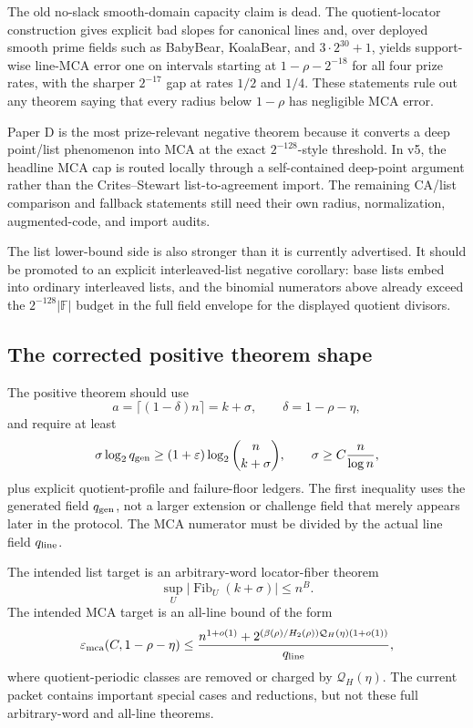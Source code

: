 \documentclass[11pt]{article}
\newcommand{\F}{\mathbb F}
\newcommand{\qline}{q_{\rm line}}
\newcommand{\qgen}{q_{\rm gen}}
\newcommand{\epsmca}{\varepsilon_{\rm mca}}
\newcommand{\Fib}{\operatorname{Fib}}
\newcommand{\Htwo}{H_2}
\newcommand{\QH}{\mathcal Q_H}
\begin{document}
The old no-slack smooth-domain capacity claim is dead.  The quotient-locator
construction gives explicit bad slopes for canonical lines and, over deployed
smooth prime fields such as BabyBear, KoalaBear, and \(3\cdot2^{30}+1\), yields
support-wise line-MCA error one on intervals starting at
\(1-\rho-2^{-18}\) for all four prize rates, with the sharper \(2^{-17}\) gap
at rates \(1/2\) and \(1/4\).  These statements rule out any theorem saying
that every radius below \(1-\rho\) has negligible MCA error.

Paper D is the most prize-relevant negative theorem because it converts a deep
point/list phenomenon into MCA at the exact \(2^{-128}\)-style threshold.  In
v5, the headline MCA cap is routed locally through a self-contained deep-point
argument rather than the Crites--Stewart list-to-agreement import.  The remaining
CA/list comparison and fallback statements still need their own radius,
normalization, augmented-code, and import audits.

The list lower-bound side is also stronger than it is currently advertised.  It
should be promoted to an explicit interleaved-list negative corollary: base lists
embed into ordinary interleaved lists, and the binomial numerators above already
exceed the \(2^{-128}|\F|\) budget in the full field envelope for the displayed
quotient divisors.

\subsection{The corrected positive theorem shape}

The positive theorem should use
\[
  a=\lceil(1-\delta)n\rceil=k+\sigma,
  \qquad \delta=1-\rho-\eta,
\]
and require at least
\[
  \sigma\log_2\qgen
  \ge (1+\varepsilon)\log_2\binom n{k+\sigma},
  \qquad
  \sigma\ge C\frac n{\log n},
\]
plus explicit quotient-profile and failure-floor ledgers.  The first inequality
uses the generated field \(\qgen\), not a larger extension or challenge field
that merely appears later in the protocol.  The MCA numerator must be divided by
the actual line field \(\qline\).

The intended list target is an arbitrary-word locator-fiber theorem
\[
  \sup_U |\Fib_U(k+\sigma)|\le n^B.
\]
The intended MCA target is an all-line bound of the form
\[
  \epsmca(C,1-\rho-\eta)
  \le
  \frac{
    n^{1+o(1)}
    +2^{(\beta(\rho)/\Htwo(\rho))\QH(\eta)(1+o(1))}
  }{\qline},
\]
where quotient-periodic classes are removed or charged by \(\QH(\eta)\).  The
current packet contains important special cases and reductions, but not these
full arbitrary-word and all-line theorems.
\end{document}
